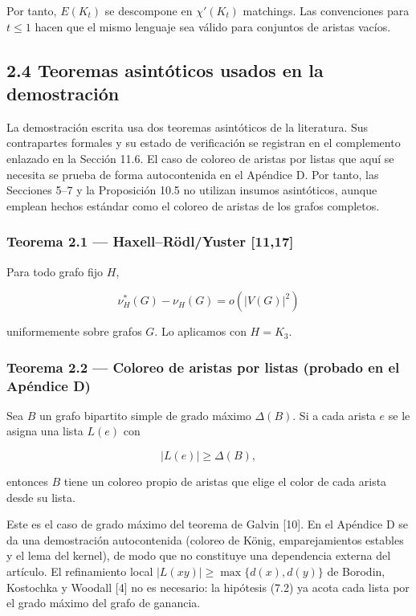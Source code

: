 \documentclass[spanish,11pt,a4paper]{article}
\begin{document}
Por tanto, \(E(K_t)\) se descompone en \(\chi'(K_t)\) matchings. Las
convenciones para \(t\le1\) hacen que el mismo lenguaje sea válido para
conjuntos de aristas vacíos.

\subsection{2.4 Teoremas asintóticos usados en la
demostración}\label{teoremas-asintuxf3ticos-usados-en-la-demostraciuxf3n}

La demostración escrita usa dos teoremas asintóticos de la literatura.
Sus contrapartes formales y su estado de verificación se registran en el
complemento enlazado en la Sección 11.6. El caso de coloreo de aristas
por listas que aquí se necesita se prueba de forma autocontenida en el
Apéndice D. Por tanto, las Secciones 5--7 y la Proposición 10.5 no
utilizan insumos asintóticos, aunque emplean hechos estándar como el
coloreo de aristas de los grafos completos.

\subsubsection{Teorema 2.1 --- Haxell--Rödl/Yuster
{[}11,17{]}}\label{teorema-2.1-haxellruxf6dlyuster-1117}

Para todo grafo fijo \(H\),

\[
\nu_H^*(G)-\nu_H(G)=o(|V(G)|^2)
\]

uniformemente sobre grafos \(G\). Lo aplicamos con \(H=K_3\).

\subsubsection{Teorema 2.2 --- Coloreo de aristas por listas (probado en
el Apéndice
D)}\label{teorema-2.2-coloreo-de-aristas-por-listas-probado-en-el-apuxe9ndice-d}

Sea \(B\) un grafo bipartito simple de grado máximo \(\Delta(B)\). Si a
cada arista \(e\) se le asigna una lista \(L(e)\) con

\[
|L(e)|\ge\Delta(B),
\]

entonces \(B\) tiene un coloreo propio de aristas que elige el color de
cada arista desde su lista.

Este es el caso de grado máximo del teorema de Galvin {[}10{]}. En el
Apéndice D se da una demostración autocontenida (coloreo de König,
emparejamientos estables y el lema del kernel), de modo que no
constituye una dependencia externa del artículo. El refinamiento local
\(|L(xy)|\ge\max\{d(x),d(y)\}\) de Borodin, Kostochka y Woodall {[}4{]}
no es necesario: la hipótesis (7.2) ya acota cada lista por el grado
máximo del grafo de ganancia.
\end{document}
